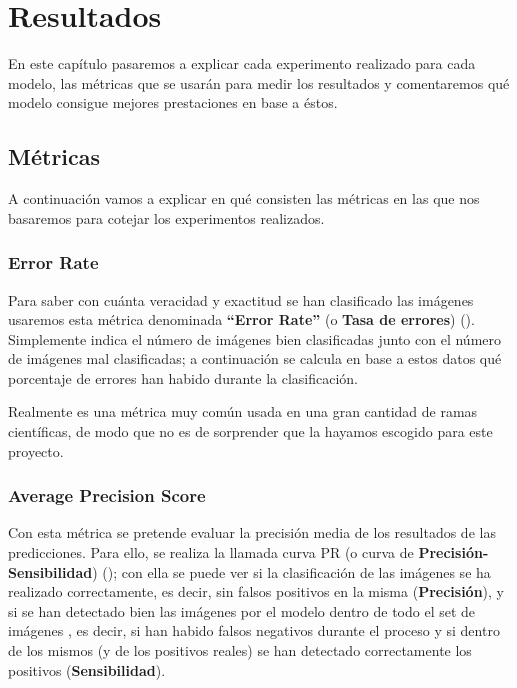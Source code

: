 \chapter{Resultados}
\label{ch:res}

En este capítulo pasaremos a explicar cada experimento realizado para cada modelo, las métricas que se usarán para medir los resultados y comentaremos qué modelo consigue mejores prestaciones en base a éstos.

\section{Métricas}

A continuación vamos a explicar en qué consisten las métricas en las que nos basaremos para cotejar los experimentos realizados.

\subsection{Error Rate}

Para saber con cuánta veracidad y exactitud se han clasificado las imágenes usaremos esta métrica denominada \textbf{``Error Rate''} (o \textbf{Tasa de errores}) (\cite{error-rate}). Simplemente indica el número de imágenes bien clasificadas junto con el número de imágenes mal clasificadas; a continuación se calcula en base a estos datos qué porcentaje de errores han habido durante la clasificación.

Realmente es una métrica muy común usada en una gran cantidad de ramas científicas, de modo que no es de sorprender que la hayamos escogido para este proyecto.

\subsection{Average Precision Score}

Con esta métrica se pretende evaluar la precisión media de los resultados de las predicciones. Para ello, se realiza la llamada curva \ac{PR} (o curva de \textbf{Precisión-Sensibilidad}) (\cite{curvas-pr}); con ella se puede ver si la clasificación de las imágenes se ha realizado correctamente, es decir, sin falsos positivos en la misma (\textbf{Precisión}), y si se han detectado bien las imágenes por el modelo dentro de todo el set de imágenes , es decir, si han habido falsos negativos durante el proceso y si dentro de los mismos (y de los positivos reales) se han detectado correctamente los positivos (\textbf{Sensibilidad}). %

